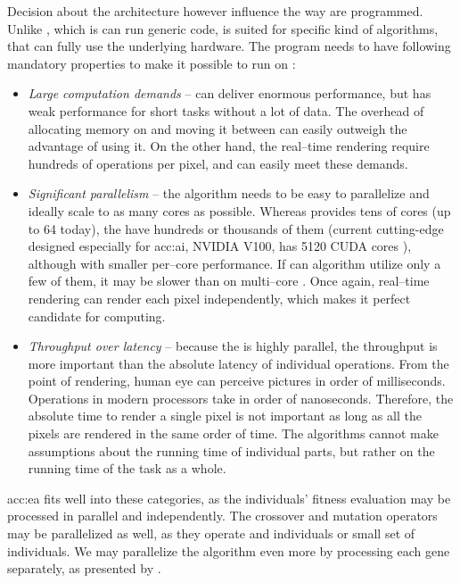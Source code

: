 Decision about the architecture however influence the way \gpu are programmed. Unlike \cpu, which is can run generic code, \gpu is suited for specific kind of algorithms, that can fully use the underlying hardware. The program needs to have following mandatory properties to make it possible to run on \gpu \citep{GPUComputingOwens}:
\begin{itemize}
    \item \textit{Large computation demands} -- \gpu can deliver enormous performance, but has weak performance for short tasks without a lot of data. The overhead of allocating memory on \gpu and moving it between can easily outweigh the advantage of using it. On the other hand, the real--time rendering require hundreds of operations per pixel, and \gpu can easily meet these demands.
    \item \textit{Significant parallelism} -- the algorithm needs to be easy to parallelize and ideally scale to as many cores as possible. Whereas \cpu provides tens of cores (up to 64 today), the \gpu have hundreds or thousands of them (current cutting-edge \gpu designed especially for \acrshort{acc:ai}, NVIDIA V100, has 5120 CUDA cores \citep{nvidiav100spec}), although with smaller per--core performance. If can algorithm utilize only a few of them, it may be slower than on multi--core \cpu. Once again, real--time rendering can render each pixel independently, which makes it perfect candidate for \gpu computing.
    \item \textit{Throughput over latency} -- because the \gpu is highly parallel, the throughput is more important than the absolute latency of individual operations. From the point of rendering, human eye can perceive pictures in order of milliseconds. Operations in modern processors take in order of nanoseconds. Therefore, the absolute time to render a single pixel is not important as long as all the pixels are rendered in the same order of time. The algorithms cannot make assumptions about the running time of individual parts, but rather on the running time of the task as a whole.
\end{itemize}

\acrlong{acc:ea} fits well into these categories, as the individuals' fitness evaluation may be processed in parallel and independently. The crossover and mutation operators may be parallelized as well, as they operate and individuals or small set of individuals. We may parallelize the algorithm even more by processing each gene separately, as presented by \citet{CHENG2019514}.


